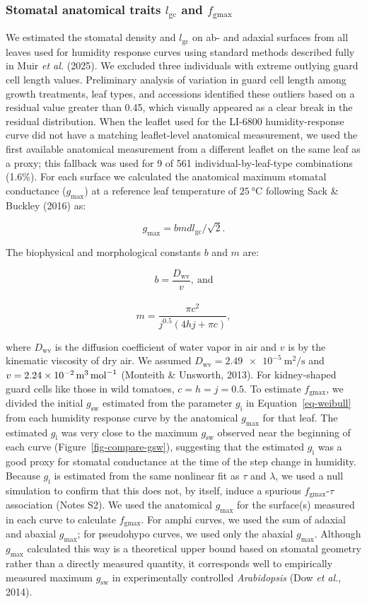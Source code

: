 \documentclass[
  letterpaper,
  DIV=11,
  numbers=noendperiod]{scrartcl}
\newcommand{\fgmax}{$f_\mathrm{gmax}$}
\newcommand{\gcl}{$l_\mathrm{gc}$}
\newcommand{\gi}{$g_\mathrm{i}$}
\newcommand{\gmax}{$g_\mathrm{max}$}
\newcommand{\gsw}{$g_\mathrm{sw}$}
\begin{document}
\subsubsection{\texorpdfstring{Stomatal anatomical traits \gcl{} and
\fgmax{}}{Stomatal anatomical traits  and }}\label{stomatal-anatomical-traits-and}

We estimated the stomatal density and \gcl{} on ab- and adaxial surfaces
from all leaves used for humidity response curves using standard methods
described fully in Muir \emph{et al.} (2025). We excluded three
individuals with extreme outlying guard cell length values. Preliminary
analysis of variation in guard cell length among growth treatments, leaf
types, and accessions identified these outliers based on a residual
value greater than 0.45, which visually appeared as a clear break in the
residual distribution. When the leaflet used for the LI-6800
humidity-response curve did not have a matching leaflet-level anatomical
measurement, we used the first available anatomical measurement from a
different leaflet on the same leaf as a proxy; this fallback was used
for 9 of 561 individual-by-leaf-type combinations (1.6\%). For each
surface we calculated the anatomical maximum stomatal conductance
(\gmax) at a reference leaf temperature of \(\SI{25}{\degreeCelsius}\)
following Sack \& Buckley (2016) as:

\[g_\mathrm{max} = b m d l_\mathrm{gc} / \sqrt{2}.\]

The biophysical and morphological constants \(b\) and \(m\) are:

\[b = \frac{D_\mathrm{wv}}{v},~\mathrm{and}\]\\
\[m = \frac{\pi c ^ 2}{j^{0.5} (4 h j + \pi c)},\]

where \(D_\mathrm{wv}\) is the diffusion coefficient of water vapor in
air and \(v\) is by the kinematic viscosity of dry air. We assumed
\(D_\mathrm{wv} = \SI{2.49e-5}{\meter\squared\per\second}\) and
\(v = \SI{2.24e-2}{\raiseto{3}\meter\per\mol}\) (Monteith \& Unsworth,
2013). For kidney-shaped guard cells like those in wild tomatoes,
\(c = h = j = 0.5\). To estimate \fgmax, we divided the initial \gsw{}
estimated from the parameter \gi{} in Equation~\ref{eq-weibull} from
each humidity response curve by the anatomical \gmax{} for that leaf.
The estimated \gi{} was very close to the maximum \gsw{} observed near
the beginning of each curve (Figure~\ref{fig-compare-gsw}), suggesting
that the estimated \gi{} was a good proxy for stomatal conductance at
the time of the step change in humidity. Because \gi{} is estimated from
the same nonlinear fit as \(\tau\) and \(\lambda\), we used a null
simulation to confirm that this does not, by itself, induce a spurious
\fgmax{}-\(\tau\) association (Notes S2). We used the anatomical \gmax{}
for the surface(s) measured in each curve to calculate \fgmax. For amphi
curves, we used the sum of adaxial and abaxial \gmax{}; for pseudohypo
curves, we used only the abaxial \gmax{}. Although \gmax{} calculated
this way is a theoretical upper bound based on stomatal geometry rather
than a directly measured quantity, it corresponds well to empirically
measured maximum \gsw{} in experimentally controlled \emph{Arabidopsis}
(Dow \emph{et al.}, 2014).
\end{document}
